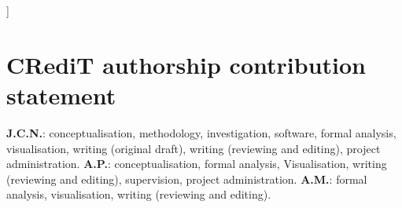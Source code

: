 \documentclass[twoside,twocolumn,9pt]{article}
\begin{document}
  ]

\renewcommand*\rmdefault{bch}\normalfont\upshape
\rmfamily
\section*{}
\vspace{-1cm}









\section*{CRediT authorship contribution statement}
\textbf{J.C.N.}: conceptualisation, methodology, investigation, software, formal analysis, visualisation, writing (original draft), writing (reviewing and editing), project administration.
\textbf{A.P.}: conceptualisation, formal analysis, Visualisation, writing (reviewing and editing), supervision, project administration.
\textbf{A.M.}: formal analysis, visualisation, writing (reviewing and editing).
\end{document}
